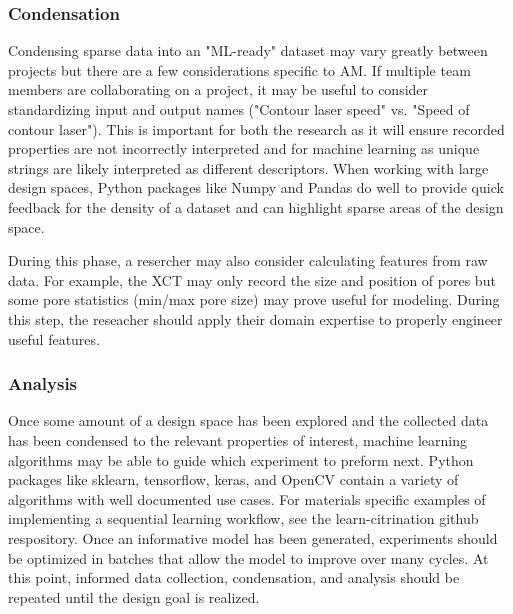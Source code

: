 \subsubsection{Condensation}
Condensing sparse data into an "ML-ready" dataset may vary greatly between projects but there are a few considerations specific to AM.
If multiple team members are collaborating on a project, it may be useful to consider standardizing input and output names ("Contour laser speed" vs. "Speed of contour laser").
This is important for both the research as it will ensure recorded properties are not incorrectly interpreted and for machine learning as unique strings are likely interpreted as different descriptors.
When working with large design spaces, Python packages like Numpy and Pandas do well to provide quick feedback for the density of a dataset and can highlight sparse areas of the design space.

During this phase, a resercher may also consider calculating features from raw data.
For example, the XCT may only record the size and position of pores but some pore statistics (min/max pore size) may prove useful for modeling.
During this step, the reseacher should apply their domain expertise to properly engineer useful features.

\subsubsection{Analysis}
Once some amount of a design space has been explored and the collected data has been condensed to the relevant properties of interest, machine learning algorithms may be able to guide which experiment to preform next.
Python packages like sklearn, tensorflow, keras, and OpenCV contain a variety of algorithms with well documented use cases.
For materials specific examples of implementing a sequential learning workflow, see the learn-citrination github respository.
Once an informative model has been generated, experiments should be optimized in batches that allow the model to improve over many cycles.
At this point, informed data collection, condensation, and analysis should be repeated until the design goal is realized.



